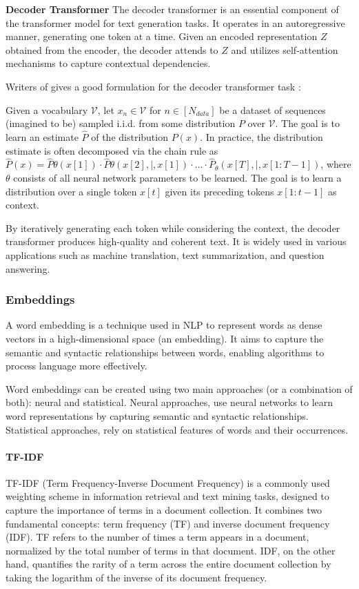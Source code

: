 \documentclass[a4paper,12pt]{article}
\begin{document}
\textbf{Decoder Transformer}
The decoder transformer is an essential component of the transformer model for text generation tasks. It operates in an autoregressive manner, generating one token at a time. Given an encoded representation $Z$ obtained from the encoder, 
the decoder attends to $Z$ and utilizes self-attention mechanisms to capture contextual dependencies.

Writers of \cite{formaltransformer} gives a good formulation for the decoder transformer task : 

Given a vocabulary $\mathcal{V}$, let $x_n \in \mathcal{V}$ for $n \in [N_{data}]$ be a dataset of sequences (imagined to be) sampled i.i.d. from some distribution $P$ over $\mathcal{V}$. 
The goal is to learn an estimate $\hat{P}$ of the distribution $P(x)$. 
In practice, the distribution estimate is often decomposed via the chain rule as $\hat{P}(x) = \hat{P}{\theta}(x[1]) \cdot \hat{P}{\theta}(x[2] ,|, x[1]) \cdot \ldots \cdot \hat{P}_{\theta}(x[T] ,|, x[1:T-1])$, 
where $\theta$ consists of all neural network parameters to be learned. 
The goal is to learn a distribution over a single token $x[t]$ given its preceding tokens $x[1:t-1]$ as context.

By iteratively generating each token while considering the context, the decoder transformer produces high-quality and coherent text. 
It is widely used in various applications such as machine translation, text summarization, and question answering.




\subsubsection{Embeddings}
A word embedding is a technique used in NLP to represent words as dense vectors in a high-dimensional space (an embedding). It aims to capture the semantic and syntactic relationships between words, enabling algorithms to process language more effectively.

Word embeddings can be created using two main approaches (or a combination of both): neural and statistical. 
Neural approaches, use neural networks to learn word representations by capturing semantic and syntactic relationships. Statistical approaches, rely on statistical features of words and their occurrences.

\paragraph{TF-IDF}
TF-IDF (Term Frequency-Inverse Document Frequency) is a commonly used weighting scheme in information retrieval and text mining tasks, designed to capture the importance of terms in a document collection. It combines two fundamental concepts: term frequency (TF) and inverse document frequency (IDF). TF refers to the number of times a term appears in a document, normalized by the total number of terms in that document. IDF, on the other hand, quantifies the rarity of a term across the entire document collection by taking the logarithm of the inverse of its document frequency. 
\end{document}

